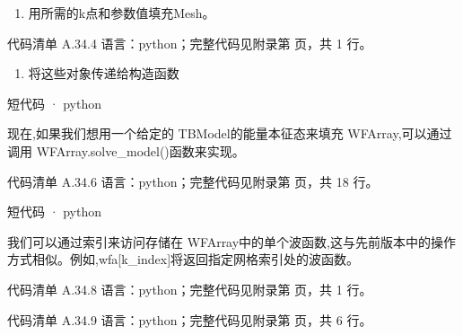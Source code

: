 \documentclass[lang=cn,scheme=chinese,color=blue,device=normal,toc=onecol,math=cm]{elegantbook}
\begin{document}
\begin{enumerate}
\item 用所需的k点和参数值填充Mesh。
\end{enumerate}


\begin{codeindexbox}{代码清单 A.34.4}
语言：python；完整代码见附录第 \pageref{code:34:4} 页，共 1 行。
\end{codeindexbox}


\begin{enumerate}
\item 将这些对象传递给构造函数
\end{enumerate}


\begin{inlinecodebox}{短代码 · python}
\end{inlinecodebox}


现在,如果我们想用一个给定的 TBModel的能量本征态来填充 WFArray,可以通过调用 WFArray.solve\_\allowbreak{}model()函数来实现。\par


\begin{codeindexbox}{代码清单 A.34.6}
语言：python；完整代码见附录第 \pageref{code:34:6} 页，共 18 行。
\end{codeindexbox}


\begin{inlinecodebox}{短代码 · python}
\end{inlinecodebox}


我们可以通过索引来访问存储在 WFArray中的单个波函数,这与先前版本中的操作方式相似。例如,wfa[k\_\allowbreak{}index]将返回指定网格索引处的波函数。\par


\begin{codeindexbox}{代码清单 A.34.8}
语言：python；完整代码见附录第 \pageref{code:34:8} 页，共 1 行。
\end{codeindexbox}


\begin{codeindexbox}{代码清单 A.34.9}
语言：python；完整代码见附录第 \pageref{code:34:9} 页，共 6 行。
\end{codeindexbox}
\end{document}
